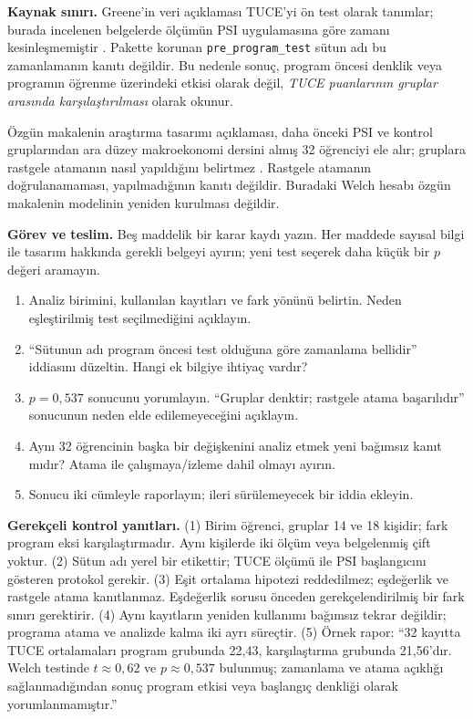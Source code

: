 \begin{outputguidebox}
\textbf{Kaynak sınırı.} Greene'in veri açıklaması TUCE'yi ön test olarak
tanımlar; burada incelenen belgelerde ölçümün PSI uygulamasına göre zamanı
kesinleşmemiştir \citep{greeneDiscreteChoice}. Pakette korunan
\texttt{pre\_program\_test} sütun adı bu zamanlamanın kanıtı değildir.
Bu nedenle sonuç, program öncesi denklik veya programın öğrenme üzerindeki
etkisi olarak değil, \emph{TUCE puanlarının gruplar arasında karşılaştırılması}
olarak okunur.

Özgün makalenin araştırma tasarımı açıklaması, daha önceki PSI ve kontrol
gruplarından ara düzey makroekonomi dersini almış 32 öğrenciyi ele alır;
gruplara rastgele atamanın nasıl yapıldığını belirtmez \citep{spector1980}.
Rastgele atamanın doğrulanamaması, yapılmadığının kanıtı değildir. Buradaki
Welch hesabı özgün makalenin modelinin yeniden kurulması değildir.
\end{outputguidebox}

\textbf{Görev ve teslim.} Beş maddelik bir karar kaydı yazın. Her maddede
sayısal bilgi ile tasarım hakkında gerekli belgeyi ayırın; yeni test seçerek
daha küçük bir $p$ değeri aramayın.
\begin{enumerate}[label=\arabic*.]
\item Analiz birimini, kullanılan kayıtları ve fark yönünü belirtin.
Neden eşleştirilmiş test seçilmediğini açıklayın.
\item ``Sütunun adı program öncesi test olduğuna göre zamanlama bellidir''
iddiasını düzeltin. Hangi ek bilgiye ihtiyaç vardır?
\item $p=0{,}537$ sonucunu yorumlayın. ``Gruplar denktir; rastgele atama
başarılıdır'' sonucunun neden elde edilemeyeceğini açıklayın.
\item Aynı 32 öğrencinin başka bir değişkenini analiz etmek yeni bağımsız
kanıt mıdır? Atama ile çalışmaya/izleme dahil olmayı ayırın.
\item Sonucu iki cümleyle raporlayın; ileri sürülemeyecek bir iddia ekleyin.
\end{enumerate}

\textbf{Gerekçeli kontrol yanıtları.}
(1) Birim öğrenci, gruplar 14 ve 18 kişidir; fark program eksi
karşılaştırmadır. Aynı kişilerde iki ölçüm veya belgelenmiş çift yoktur.
(2) Sütun adı yerel bir etikettir; TUCE ölçümü ile PSI başlangıcını gösteren
protokol gerekir. (3) Eşit ortalama hipotezi reddedilmez; eşdeğerlik ve
rastgele atama kanıtlanmaz. Eşdeğerlik sorusu önceden gerekçelendirilmiş bir
fark sınırı gerektirir. (4) Aynı kayıtların yeniden kullanımı bağımsız tekrar
değildir; programa atama ve analizde kalma iki ayrı süreçtir.
(5) Örnek rapor: ``32 kayıtta TUCE ortalamaları program grubunda 22,43,
karşılaştırma grubunda 21,56'dır. Welch testinde $t\approx0{,}62$ ve
$p\approx0{,}537$ bulunmuş; zamanlama ve atama açıklığı sağlanmadığından
sonuç program etkisi veya başlangıç denkliği olarak yorumlanmamıştır.''


